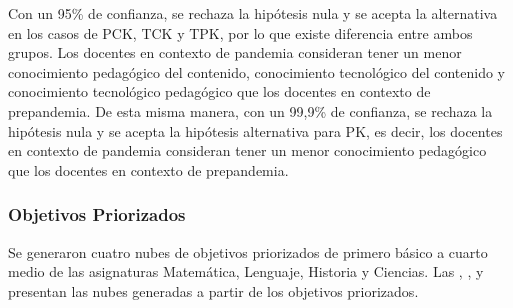 \documentclass[spanish]{textolivre}
\begin{document}
Con un 95\% de confianza, se rechaza la hipótesis nula y se acepta la alternativa en los casos de PCK, TCK y TPK, por lo que existe diferencia entre ambos grupos. Los docentes en contexto de pandemia consideran tener un menor conocimiento pedagógico del contenido, conocimiento tecnológico del contenido y conocimiento tecnológico pedagógico que los docentes en contexto de prepandemia. De esta misma manera, con un 99,9\% de confianza, se rechaza la hipótesis nula y se acepta la hipótesis alternativa para PK, es decir, los docentes en contexto de pandemia consideran tener un menor conocimiento pedagógico que los docentes en contexto de prepandemia.

\subsubsection{Objetivos Priorizados}\label{sec-quotesandfootnotes}
Se generaron cuatro nubes de objetivos priorizados de primero básico a cuarto medio de las asignaturas Matemática, Lenguaje, Historia y Ciencias. Las , ,  y  presentan las nubes generadas a partir de los objetivos priorizados.
\end{document}
